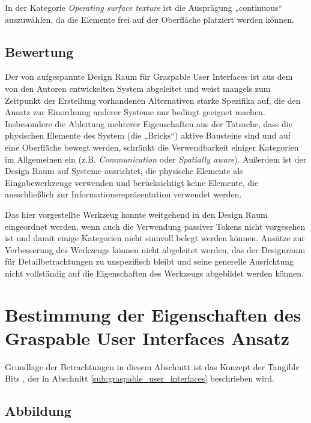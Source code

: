 In der Kategorie \emph{Operating surface texture} ist die Ausprägung „continuous“ auszuwählen, da die Elemente frei auf der Oberfläche platziert werden können.

\subsection{Bewertung}

Der von \citet{Fitzmaurice95} aufgespannte Design Raum für Graspable User Interfaces ist aus dem von den Autoren entwickelten System abgeleitet und weist mangels zum Zeitpunkt der Erstellung vorhandenen Alternativen starke Spezifika auf, die den Ansatz zur Einordnung anderer Systeme nur bedingt geeignet machen. Insbesondere die Ableitung mehrerer Eigenschaften aus der Tatsache, dass die physischen Elemente des System (die „Bricks“) aktive Bausteine sind und auf eine Oberfläche bewegt werden, schränkt die Verwendbarkeit einiger Kategorien im Allgemeinen ein (z.B. \emph{Communication} oder \emph{Spatially aware}). Außerdem ist der Design Raum auf Systeme ausrichtet, die physische Elemente als Eingabewerkzeuge verwenden und berücksichtigt keine Elemente, die ausschließlich zur Informationsrepräsentation verwendet werden.

Das hier vorgestellte Werkzeug konnte weitgehend in den Design Raum eingeordnet werden, wenn auch die Verwendung passiver Tokens nicht vorgesehen ist und damit einige Kategorien nicht sinnvoll belegt werden können. Ansätze zur Verbesserung des Werkzeugs können nicht abgeleitet werden, das der Designraum für Detailbetrachtungen zu unspezifisch bleibt und seine generelle Ausrichtung nicht vollständig auf die Eigenschaften des Werkzeugs abgebildet werden können.


\section{Bestimmung der Eigenschaften des Graspable User Interfaces Ansatz} %
\label{sec:bestimmung_der_eigenschaften_des_graspable_user_interfaces_ansatz}

Grundlage der Betrachtungen in diesem Abschnitt ist das Konzept der Tangible Bits \citep{Fitzmaurice96}, der in Abschnitt \ref{sub:graspable_user_interfaces} beschrieben wird.

\subsection{Abbildung}

